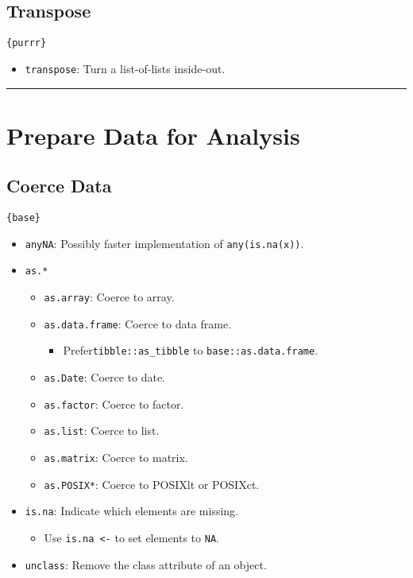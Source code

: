 \documentclass[]{book}
\providecommand{\tightlist}{%
  \setlength{\itemsep}{0pt}\setlength{\parskip}{0pt}}
\begin{document}
\hypertarget{transpose}{%
\subsection{Transpose}\label{transpose}}

\texttt{\{purrr\}}

\begin{itemize}
\tightlist
\item
  \texttt{transpose}: Turn a list-of-lists inside-out.
\end{itemize}

\begin{center}\rule{0.5\linewidth}{\linethickness}\end{center}

\hypertarget{prepare-data-for-analysis}{%
\section{Prepare Data for Analysis}\label{prepare-data-for-analysis}}

\hypertarget{coerce-data}{%
\subsection{Coerce Data}\label{coerce-data}}

\texttt{\{base\}}

\begin{itemize}
\tightlist
\item
  \texttt{anyNA}: Possibly faster implementation of \texttt{any(is.na(x))}.
\item
  \texttt{as.*}

  \begin{itemize}
  \tightlist
  \item
    \texttt{as.array}: Coerce to array.
  \item
    \texttt{as.data.frame}: Coerce to data frame.

    \begin{itemize}
    \tightlist
    \item
      Prefer\texttt{tibble::as\_tibble} to \texttt{base::as.data.frame}.
    \end{itemize}
  \item
    \texttt{as.Date}: Coerce to date.
  \item
    \texttt{as.factor}: Coerce to factor.
  \item
    \texttt{as.list}: Coerce to list.
  \item
    \texttt{as.matrix}: Coerce to matrix.
  \item
    \texttt{as.POSIX*}: Coerce to POSIXlt or POSIXct.
  \end{itemize}
\item
  \texttt{is.na}: Indicate which elements are missing.

  \begin{itemize}
  \tightlist
  \item
    Use \texttt{is.na\ \textless{}-} to set elements to \texttt{NA}.
  \end{itemize}
\item
  \texttt{unclass}: Remove the class attribute of an object.
\end{itemize}
\end{document}
